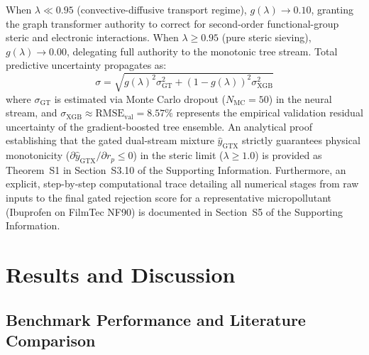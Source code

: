 \documentclass[11pt]{article}
\begin{document}
When $\lambda \ll 0.95$ (convective-diffusive transport regime), $g(\lambda) \to 0.10$, granting the graph transformer authority to correct for second-order functional-group steric and electronic interactions. When $\lambda \geq 0.95$ (pure steric sieving), $g(\lambda) \to 0.00$, delegating full authority to the monotonic tree stream. Total predictive uncertainty propagates as:
\begin{equation}
\sigma = \sqrt{g(\lambda)^2 \sigma_{\mathrm{GT}}^2 + \left(1-g(\lambda)\right)^2 \sigma_{\mathrm{XGB}}^2}
\label{eq:mixture_sigma}
\end{equation}
where $\sigma_{\mathrm{GT}}$ is estimated via Monte Carlo dropout ($N_{\mathrm{MC}} = 50$) in the neural stream, and $\sigma_{\mathrm{XGB}} \approx \mathrm{RMSE}_{\mathrm{val}} = 8.57\%$ represents the empirical validation residual uncertainty of the gradient-boosted tree ensemble. An analytical proof establishing that the gated dual-stream mixture $\hat{y}_{\mathrm{GTX}}$ strictly guarantees physical monotonicity ($\partial \hat{y}_{\mathrm{GTX}} / \partial r_p \leq 0$) in the steric limit ($\lambda \geq 1.0$) is provided as Theorem~S1 in Section~S3.10 of the Supporting Information. Furthermore, an explicit, step-by-step computational trace detailing all numerical stages from raw inputs to the final gated rejection score for a representative micropollutant (Ibuprofen on FilmTec NF90) is documented in Section~S5 of the Supporting Information.

\section{Results and Discussion}
\label{sec:results}

\subsection{Benchmark Performance and Literature Comparison}
\label{subsec:benchmark}
\end{document}
